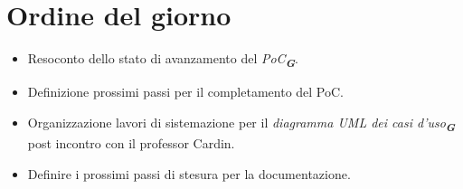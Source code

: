 

\section{Ordine del giorno}

\begin{itemize}
    \item Resoconto dello stato di avanzamento del \emph{PoC}\textsubscript{\textit{\textbf{G}}}.
    \item Definizione prossimi passi per il completamento del PoC.
    \item Organizzazione lavori di sistemazione per il \emph{diagramma UML dei casi d'uso}\textsubscript{\textit{\textbf{G}}} post incontro con il professor Cardin.
    \item Definire i prossimi passi di stesura per la documentazione.
\end{itemize}

